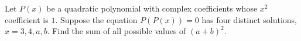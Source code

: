 Let $P(x)$ be a quadratic polynomial with complex coefficients whose $x^2$ coefficient is $1$. Suppose the equation $P(P(x))=0$ has four distinct solutions, $x=3,4,a,b$. Find the sum of all possible values of $(a+b)^2$.